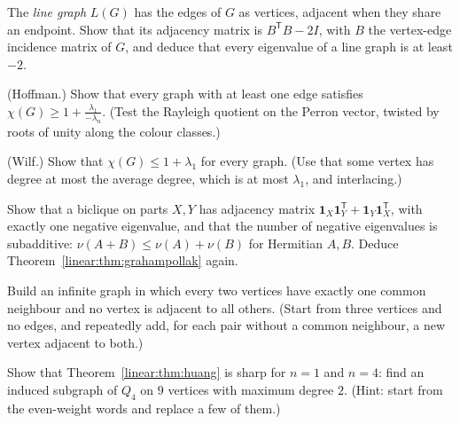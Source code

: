 \begin{exercise}[$\star\star$]\label{linear:ex:linegraph}
The \emph{line graph} $L(G)$ has the edges of $G$ as vertices, adjacent when they share an endpoint. Show that its adjacency matrix
is $B^{\mathsf T}B-2I$, with $B$ the vertex-edge incidence matrix of $G$, and deduce that every eigenvalue of a line graph is at least
$-2$.
\end{exercise}

\begin{exercise}[$\star\star$]\label{linear:ex:chromatic}
(Hoffman.) Show that every graph with at least one edge satisfies $\chi(G)\ge1+\frac{\lambda_1}{-\lambda_n}$. (Test the Rayleigh quotient on the
Perron vector, twisted by roots of unity along the colour classes.)
\end{exercise}

\begin{exercise}[$\star\star$]\label{linear:ex:wilf}
(Wilf.) Show that $\chi(G)\le1+\lambda_1$ for every graph. (Use that some vertex has degree at most the average degree, which is at
most $\lambda_1$, and interlacing.)
\end{exercise}

\begin{exercise}[$\star\star\star$]\label{linear:ex:inertia}
Show that a biclique on parts $X,Y$ has adjacency matrix $\mathbf 1_X\mathbf 1_Y^{\mathsf T}+\mathbf 1_Y\mathbf 1_X^{\mathsf T}$, with exactly
one negative eigenvalue, and that the number of negative eigenvalues is subadditive: $\nu(A+B)\le\nu(A)+\nu(B)$ for Hermitian $A,B$.
Deduce Theorem~\ref{linear:thm:grahampollak} again.
\end{exercise}

\begin{exercise}[$\star\star$]\label{linear:ex:infinitefriends}
Build an infinite graph in which every two vertices have exactly one common neighbour and no vertex is adjacent to all others.
(Start from three vertices and no edges, and repeatedly add, for each pair without a common neighbour, a new vertex adjacent to both.)
\end{exercise}

\begin{exercise}[$\star\star$]\label{linear:ex:huangsharp}
Show that Theorem~\ref{linear:thm:huang} is sharp for $n=1$ and $n=4$: find an induced subgraph of $Q_4$ on $9$ vertices with maximum
degree $2$. (Hint: start from the even-weight words and replace a few of them.)
\end{exercise}

